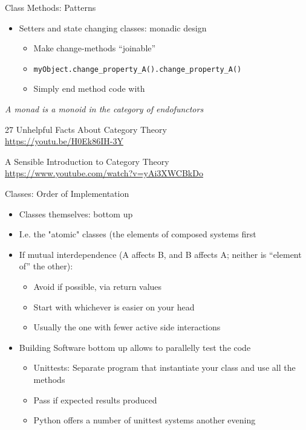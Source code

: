 \begin{frame}{Class Methods: Patterns}
%
\begin{itemize}
\item Setters and state changing classes: monadic design
	\begin{itemize}
	\item Make change-methods \enquote{joinable}
	\item \texttt{myObject.change\_property\_A().change\_property\_A()}
	\item Simply end method code with 
	\end{itemize}
\end{itemize}
%
\begin{hintbox}
\emph{A monad is a monoid in the category of endofunctors}

\vspace{6pt}
27 Unhelpful Facts About Category Theory\\
\url{https://youtu.be/H0Ek86IH-3Y}

\vspace{6pt}
A Sensible Introduction to Category Theory\\
\url{https://www.youtube.com/watch?v=yAi3XWCBkDo}
\end{hintbox}
%
\end{frame}


\begin{frame}{Classes: Order of Implementation}
%
\begin{itemize}
\item Classes themselves: bottom up
\item I.\;e. the "atomic" classes (the elements of composed systems first
\item If mutual interdependence (A affects B, and B affects A; neither is \enquote{element of} the other):
	\begin{itemize}
	\item Avoid if possible, \zB via return values
	\item Start with whichever is easier on your head
	\item Usually the one with fewer active side interactions
	\end{itemize}
\item Building Software bottom up allows to parallelly test the code
	\begin{itemize}
	\item Unittests: Separate program that instantiate your class and use all the methods
	\item Pass if expected results produced
	\item Python offers a number of unittest systems \Thus another evening
	\end{itemize}
\end{itemize}
%
\end{frame}

